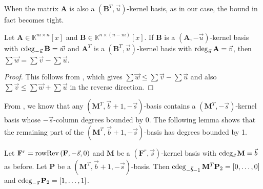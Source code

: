When the matrix $\mathbf{A}$ is also a $\left(\mathbf{B}^{T},\vec{u}\right)$-kernel
basis, as in our case, the bound in fact becomes tight.
\begin{lem}
\label{lem:mutualMinimalNullspaceBasisDegrees}Let $\mathbf{A}\in\mathbb{K}^{m\times n}[x]$
and $\mathbf{B}\in\mathbb{K}^{n\times(n-m)}\left[x\right]$. If $\mathbf{B}$
is a $(\mathbf{A},-\vec{u})$-kernel basis with $\cdeg_{-\vec{u}}\mathbf{B}=\vec{w}$
and $\mathbf{A}^{T}$ is a $\left(\mathbf{B}^{T},\vec{u}\right)$-kernel
basis with $\rdeg_{\vec{u}}\mathbf{A}=\vec{v}$, then $\sum\vec{w}=\sum\vec{v}-\sum\vec{u}$.\end{lem}
\begin{proof}
This follows from , which
gives $\sum\vec{w}\le\sum\vec{v}-\sum\vec{u}$ and also $\sum\vec{v}\le\sum\vec{w}+\sum\vec{u}$
in the reverse direction.
\end{proof}
From , we know that any
$\left(\mathbf{M}^{T},\vec{b}+1,-\vec{s}\right)$-basis contains a
$\left(\mathbf{M}^{T},-\vec{s}\right)$-kernel basis whose $-\vec{s}$-column
degrees bounded by 0. The following lemma shows that the remaining
part of the $\left(\mathbf{M}^{T},\vec{b}+1,-\vec{s}\right)$-basis
has degrees bounded by 1.
\begin{lem}
\label{lem:nullspaceOrderbasisDegree}Let $\mathbf{F}^{r}=\operatorname{rowRev}\left(\mathbf{F},-\vec{s},0\right)$
and $\mathbf{M}$ be a $(\mathbf{F}^{r},\vec{s})$-kernel basis with
$\cdeg_{\vec{s}}\mathbf{M}=\vec{b}$ as before. Let $\mathbf{P}$
be a $\left(\mathbf{M}^{T},\vec{b}+1,-\vec{s}\right)$-basis. Then
$\cdeg_{-\vec{b}-1}\mathbf{M}^{T}\mathbf{P}_{2}=\left[0,\dots,0\right]$
and $\cdeg_{-\vec{s}}\mathbf{P}_{2}=\left[1,\dots,1\right]$.\end{lem}
